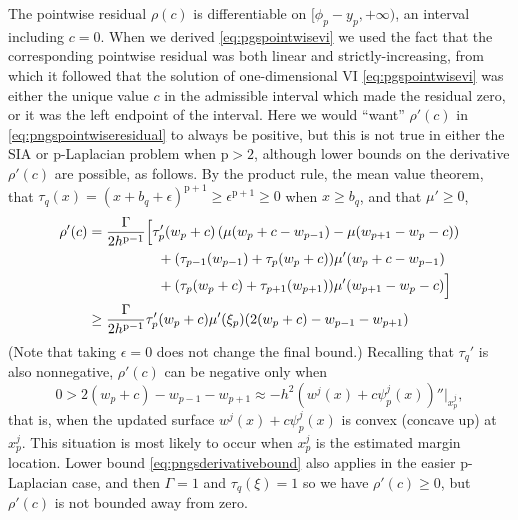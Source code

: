 \documentclass[letterpaper,final,12pt,reqno]{amsart}
\theoremstyle{claim}
\newcommand{\eps}{\epsilon}
\newcommand{\pp}{{\text{p}}}
\numberwithin{equation}{section}
\numberwithin{figure}{section}
\numberwithin{table}{section}
\numberwithin{theorem}{section}
\begin{document}
The pointwise residual $\rho(c)$ is differentiable on $[\phi_p - y_p,+\infty)$, an interval including $c=0$.  When we derived \eqref{eq:pgspointwisevi} we used the fact that the corresponding pointwise residual was both linear and strictly-increasing, from which it followed that the solution of one-dimensional VI \eqref{eq:pgspointwisevi} was either the unique value $c$ in the admissible interval which made the residual zero, or it was the left endpoint of the interval.  Here we would ``want'' $\rho'(c)$ in \eqref{eq:pngspointwiseresidual} to always be positive, but this is not true in either the SIA or $\pp$-Laplacian problem when $\pp>2$, although lower bounds on the derivative $\rho'(c)$ are possible, as follows.  By the product rule, the mean value theorem, that $\tau_q(x) = (x+b_q+\eps)^{\pp+1} \ge \eps^{\pp+1}\ge 0$ when $x\ge b_q$, and that $\mu'\ge 0$,
\begin{align}
  \rho'(c) &= \frac{\Gamma}{2h^{\pp-1}} \Big[\tau_p'(w_p+c) \left(\mu(w_p+c-w_{p-1}) -  \mu(w_{p+1}-w_p-c)\right) \label{eq:pngsderivativebound} \\
        &\qquad\qquad\quad + (\tau_{p-1}(w_{p-1}) + \tau_p(w_p+c)) \mu'(w_p+c-w_{p-1}) \notag \\
        &\qquad\qquad\quad + (\tau_p(w_p+c) + \tau_{p+1}(w_{p+1})) \mu'(w_{p+1}-w_p-c)\Big] \notag \\
        &\ge \frac{\Gamma}{2h^{\pp-1}} \tau_p'(w_p+c) \mu'(\xi_p) (2(w_p+c) - w_{p-1} - w_{p+1}) \notag
\end{align}
(Note that taking $\eps=0$ does not change the final bound.)  Recalling that $\tau_q'$ is also nonnegative, $\rho'(c)$ can be negative only when
    $$0 > 2(w_p+c) - w_{p-1} - w_{p+1} \approx - h^2\left(w^j(x) + c \psi_p^j(x)\right)''\Big|_{x_p^j},$$
that is, when the updated surface $w^j(x) + c \psi_p^j(x)$ is convex (concave up) at $x_p^j$.  This situation is most likely to occur when $x_p^j$ is the estimated margin location.  Lower bound \eqref{eq:pngsderivativebound} also applies in the easier $\pp$-Laplacian case, and then $\Gamma=1$ and $\tau_q(\xi)=1$ so we have $\rho'(c)\ge 0$, but $\rho'(c)$ is not bounded away from zero.
\end{document}

